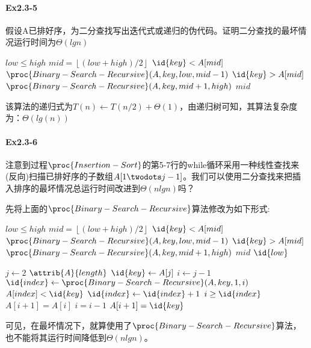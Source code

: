 \documentclass[a4paper,11pt]{article}
\newcommand{\floor}[1]{\left\lfloor #1 \right\rfloor}
\begin{document}
\paragraph*{Ex2.3-5}
假设A已排好序，为二分查找写出迭代式或递归的伪代码。证明二分查找的最坏情况运行时间为$\Theta(lgn)$
\begin{codebox}
	\li \If $low \leq high$
	\li 	\Then
			$mid = \floor{(low + high) / 2}$
	\li		\If $\id{key} < A[mid]$
	\li			\Then \Return $\proc{Binary-Search-Recursive}(A, key, low, mid - 1)$	
	\li		\ElseIf $\id{key} > A[mid]$
	\li			\Then \Return $\proc{Binary-Search-Recursive}(A, key, mid + 1, high)$
	\li		\ElseNoIf
	\li			\Return $mid$
			\End
	\li	\Else
   	\li 	\Return {}		
		\End	
\end{codebox}
\noindent 该算法的递归式为$T(n) \gets T(n/2) + \Theta(1)$，由递归树可知，其算法复杂度为：$\Theta(lg(n))$
\paragraph*{Ex2.3-6}
注意到过程$\proc{Insertion-Sort}$的第5-7行的while循环采用一种线性查找来(反向)扫描已排好序的子数组$A[1 \twodots j-1]$。我们可以使用二分查找来把插入排序的最坏情况总运行时间改进到$\Theta(nlgn)$吗？

先将上面的$\proc{Binary-Search-Recursive}$算法修改为如下形式:
\begin{codebox}
	\li \If $low \leq high$
	\li 	\Then
			$mid = \floor{(low + high) / 2}$
	\li		\If $\id{key} < A[mid]$
	\li			\Then \Return $\proc{Binary-Search-Recursive}(A, key, low, mid - 1)$	
	\li		\ElseIf $\id{key} > A[mid]$
	\li			\Then \Return $\proc{Binary-Search-Recursive}(A, key, mid + 1, high)$
	\li		\ElseNoIf
	\li			\Return $mid$
			\End
	\li	\Else
	\li 	\Return $\id{low}$	
		\End	
\end{codebox}
\begin{codebox}
	\li \For $j \gets 2 $ \To $\attrib{A}{length}$
	\li \Do
			$\id{key} \gets A[j]$
	\li		$i \gets j - 1$
	\li		$\id{index} \gets \proc{Binary-Search-Recursive}(A, key, 1, i)$
	\li 	\If $A[index] < \id{key}$
	\li			\Then 
				$\id{index} \gets \id{index} + 1$
				\End
	\li		\While $i \geq \id{index}$
	\li			\Do
				$A[i + 1] = A[i]$
	\li			$i = i - 1$
				\End
	\li		$A[i+1] = \id{key}$
		\End
	
\end{codebox}
\noindent 可见，在最坏情况下，就算使用了$\proc{Binary-Search-Recursive}$算法，也不能将其运行时间降低到$\Theta(nlgn)$。
\end{document}

